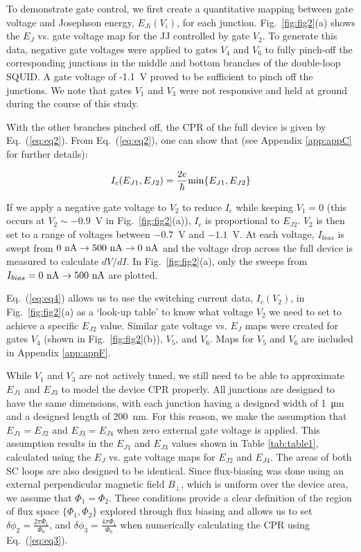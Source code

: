 \documentclass[%
 reprint,
 amsmath,amssymb,
 aps,
]{revtex4-2}
\begin{document}
To demonstrate gate control, we first create a quantitative mapping between gate voltage and Josephson energy, $E_{Ji}(V_i)$, for each junction. Fig.~\ref{fig:fig2}(a) shows the $E_J$ vs. gate voltage map for the JJ controlled by gate $V_2$. To generate this data, negative gate voltages were applied to gates $V_4$ and $V_6$ to fully pinch-off the corresponding junctions in the middle and bottom branches of the double-loop SQUID. A gate voltage of -1.1~V proved to be sufficient to pinch off the junctions. We note that gates $V_1$ and $V_3$ were not responsive and held at ground during the course of this study.

With the other branches pinched off, the CPR of the full device is given by Eq.~(\ref{eq:eq2}). From Eq.~(\ref{eq:eq2}), one can show that (see Appendix \ref{app:appC} for further details):

\begin{equation}
    \label{eq:eq4}
       I_c(E_{J1},E_{J2}) = \frac{2e}{\hbar} \textnormal{min}\{E_{J1},E_{J2}\} 
\end{equation}

If we apply a negative gate voltage to $V_2$ to reduce $I_c$ while keeping $V_1=0$ (this occurs at $V_2\sim-0.9$~V in Fig.~\ref{fig:fig2}(a)), $I_c$ is proportional to $E_{J2}$. $V_2$ is then set to a range of voltages between $-0.7$~V and $-1.1$~V. At each voltage, $I_{bias}$ is swept from $0~\textnormal{nA} \rightarrow 500~\textnormal{nA} \rightarrow 0~\textnormal{nA}$ and the voltage drop across the full device is measured to calculate $dV/dI$. In Fig.~\ref{fig:fig2}(a), only the sweeps from $I_{bias}=0~\textnormal{nA} \rightarrow 500~\textnormal{nA}$ are plotted. 

Eq.~(\ref{eq:eq4}) allows us to use the switching current data, $I_c(V_2)$, in Fig.~\ref{fig:fig2}(a) as a `look-up table' to know what voltage $V_2$ we need to set to achieve a specific $E_{J2}$ value. Similar gate voltage vs. $E_J$ maps were created for gates $V_4$ (shown in Fig.~\ref{fig:fig2}(b)), $V_5$, and $V_6$. Maps for $V_5$ and $V_6$ are included in Appendix \ref{app:appF}.

While $V_1$ and $V_3$ are not actively tuned, we still need to be able to approximate $E_{J1}$ and $E_{J3}$ to model the device CPR properly. All junctions are designed to have the same dimensions, with each junction having a designed width of 1~μm and a designed length of 200~nm. For this reason, we make the assumption that $E_{J1}=E_{J2}$ and $E_{J3}=E_{J4}$ when zero external gate voltage is applied. This assumption results in the $E_{J1}$ and $E_{J3}$ values shown in Table \ref{tab:table1}, calculated using the $E_J$ vs. gate voltage maps for $E_{J2}$ and $E_{J4}$. The areas of both SC loops are also designed to be identical. Since flux-biasing was done using an external perpendicular magnetic field $B_{\perp}$, which is uniform over the device area, we assume that $\Phi_1=\Phi_2$. These conditions provide a clear definition of the region of flux space $\{\Phi_1,\Phi_2\}$ explored through flux biasing and allows us to set $\delta \phi_2 = \frac{2\pi\Phi_1}{\Phi_0}$, and $\delta \phi_3 = \frac{4\pi\Phi_1}{\Phi_0}$ when numerically calculating the CPR using Eq.~(\ref{eq:eq3}).
\end{document}
